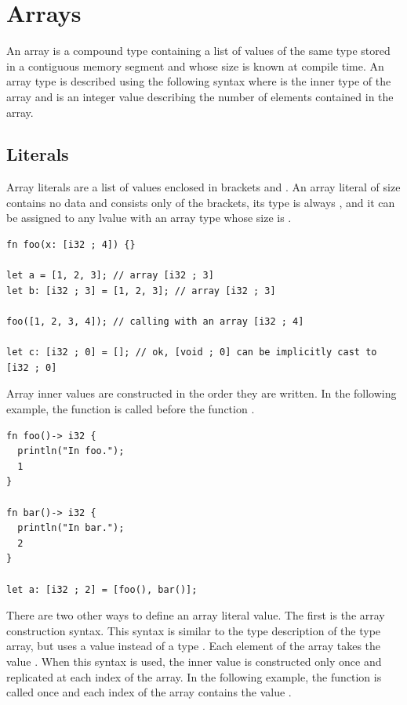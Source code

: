 \section{Arrays}%
\label{sec:arrays}

 An array is a compound type containing a list of values of the same type stored
 in a contiguous memory segment and whose size is known at compile time. An
 array type is described using the following syntax \token{[T ; N]} where
  is the inner type of the array and  is an integer value
 describing the number of elements contained in the array.

\subsection {Literals}

Array literals are a list of values enclosed in brackets \token{[} and
  \token{]}. An array literal of size  contains no data and consists
only of the brackets, its type is always \token{[void ; 0]}, and it can be
assigned to any lvalue with an array type whose size is .

\begin{lstlisting}[style=coloredverbatim]
fn foo(x: [i32 ; 4]) {}

let a = [1, 2, 3]; // array [i32 ; 3]
let b: [i32 ; 3] = [1, 2, 3]; // array [i32 ; 3]

foo([1, 2, 3, 4]); // calling with an array [i32 ; 4]

let c: [i32 ; 0] = []; // ok, [void ; 0] can be implicitly cast to [i32 ; 0]
\end{lstlisting}

Array inner values are constructed in the order they are written. In the
following example, the function  is called before the function
.

\begin{lstlisting}[style=coloredverbatim]
fn foo()-> i32 {
  println("In foo.");
  1
}

fn bar()-> i32 {
  println("In bar.");
  2
}

let a: [i32 ; 2] = [foo(), bar()];
\end{lstlisting}

There are two other ways to define an array literal value. The first is the
array construction syntax. This syntax is similar to the type description of the
type array, but uses a value instead of a type \token{[V ; N]}. Each element of
the array takes the value . When this syntax is used, the inner value
is constructed only once and replicated at each index of the array. In the
following example, the function  is called once and each index of
the array contains the value .

